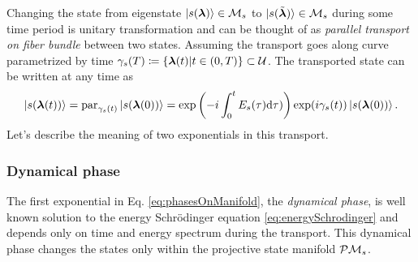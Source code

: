 Changing the state from eigenstate $\ket{s({\bm\lambda})}\in\mathcal{M}_s$ to $\ket{s(\tilde{{\bm\lambda}})}\in\mathcal{M}_s$ during some time period is unitary transformation and can be thought of as \emph{parallel transport on fiber bundle} between two states. Assuming the transport goes along curve parametrized by time $\gamma_s(T)\coloneqq\{{\bm\lambda}(t)|t\in(0,T)\}\subset \mathcal U$. The transported state can be written at any time as
\begin{equation}
    \ket{s({\bm\lambda}(t))} = \textrm{par}_{\gamma_s(t)}\ket{s({\bm\lambda}(0))} = \exp\left(-i\int_0^tE_s(\tau)\mathrm{d}\tau)\right)\exp(i\gamma_s(t))\ket{s({\bm\lambda}(0))}.
    \label{eq:phasesOnManifold}
\end{equation}
Let's describe the meaning of two exponentials in this transport.
\subsubsection{Dynamical phase}
The first exponential in Eq. \ref{eq:phasesOnManifold}, the \emph{dynamical phase}, is well known solution to the energy Schr\"odinger equation \ref{eq:energySchrodinger} and depends only on time and energy spectrum during the transport. This dynamical phase changes the states only within the projective state manifold $\mathcal{P}\mathcal{M}_s$. 

